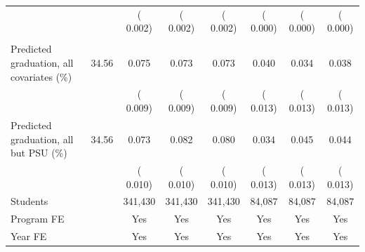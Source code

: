 \begin{tabular}{lccccccc}
 & & ( 0.002) & ( 0.002) & ( 0.002) & ( 0.000) & ( 0.000) & ( 0.000) \\
\addlinespace
\multicolumn{8}{l}{\textit{Joint tests}} \\
Predicted graduation, all covariates (\%) &  34.56 &   0.075\sym{***} &   0.073\sym{***} &   0.073\sym{***} &   0.040\sym{***} &   0.034\sym{***} &   0.038\sym{***} \\
 & & ( 0.009) & ( 0.009) & ( 0.009) & ( 0.013) & ( 0.013) & ( 0.013) \\
Predicted graduation, all but PSU (\%) &  34.56 &   0.073\sym{***} &   0.082\sym{***} &   0.080\sym{***} &   0.034\sym{***} &   0.045\sym{***} &   0.044\sym{***} \\
 & & ( 0.010) & ( 0.010) & ( 0.010) & ( 0.013) & ( 0.013) & ( 0.013) \\
\midrule
Students & &   341,430 &   341,430 &   341,430 &    84,087 &    84,087 &    84,087 \\
Program FE & & Yes & Yes & Yes & Yes & Yes & Yes \\
Year FE & & Yes & Yes & Yes & Yes & Yes & Yes \\
\bottomrule
\end{tabular}
